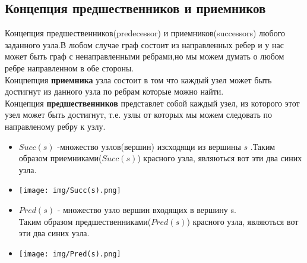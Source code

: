 \documentclass[12pt]{article}
\begin{document}
\subsection*{Концепция предшественников и приемников}
Концепция предшественников(predecessor) и приемников(successors) любого заданного узла.В любом случае граф состоит из направленных ребер и у нас может быть граф с ненаправленными ребрами,но мы можем думать о любом ребре направленном  в обе стороны.\\
Концпепция \textbf{приемника} узла состоит в том что каждый узел может быть достигнут из данного узла по ребрам которые можно найти.\\
Концепция \textbf{предшественников} представлет собой каждый узел, из которого этот узел может быть достигнут, т.е. узлы от которых мы можем следовать по направленому ребру к узлу.
\begin{itemize}
    \item $Succ(s)$ -множество узлов(вершин) изсходящи из вершины $s$ .Таким образом приемниками($Succ(s)$) красного узла, являються вот эти два синих узла.
    \item \texttt{[image: img/Succ(s).png]}
    \item $Pred(s)$ - множество узло вершин входящих в вершину s.\\Таким образом предшественниками($Pred(s)$) красного узла, являються вот эти два синих узла.
    \item \texttt{[image: img/Pred(s).png]}
\end{itemize}
\end{document}
